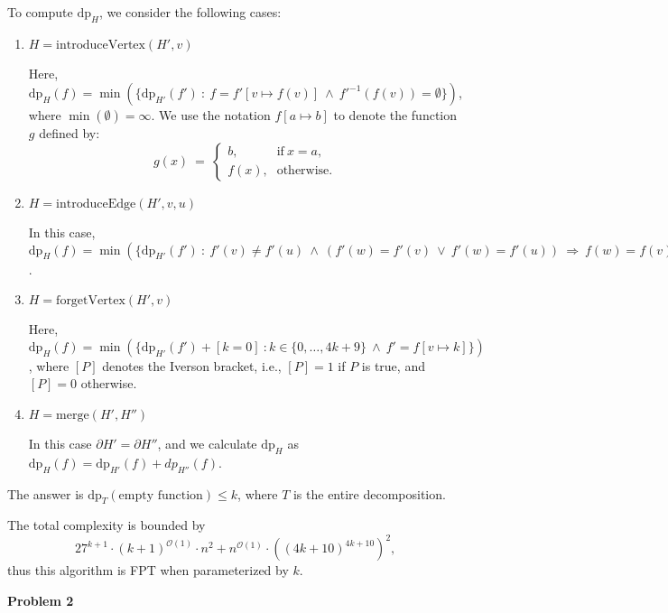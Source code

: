 \documentclass[12pt]{article}
\begin{document}
	\medskip
	
	To compute \(\text{dp}_{H}\), we consider the following cases:
	\begin{enumerate}
		\item \(H = \text{introduceVertex}(H', v)\)
		      
		      Here, \(\text{dp}_{H}(f) = \min(\{\text{dp}_{H'}(f') \ : \ f =
		      f'[v \mapsto f(v)] \ \wedge \ f'^{-1}(f(v)) = \emptyset\})\),
		      where \(\min(\emptyset) = \infty\). We use the notation
		      \(f[a \mapsto b]\) to denote the function \(g\) defined by:
		      \[ g(x) \ = \ \begin{cases} b \text{,} & \text{if} \ x = a
		      \text{,} \\ f(x) \text{,} & \text{otherwise.} \end{cases} \]
		
		\item \(H = \text{introduceEdge}(H', v, u)\)
		      
		      In this case, \(\text{dp}_{H}(f) = \min(\{\text{dp}_{H'}(f') \ : \
		      f'(v) \neq f'(u) \ \wedge \ (f'(w) = f'(v) \ \vee \ f'(w) = f'(u))
		      \ \Rightarrow \ f(w) = f(v) = f(u)\})\).
		
		\item \(H = \text{forgetVertex}(H', v)\)
		      
		      Here, \(\text{dp}_{H}(f) = \min(\{\text{dp}_{H'}(f') + [k = 0] \ :
		      k \in \{0, \ldots, 4k + 9\} \ \wedge \ f' = f[v \mapsto k]\})\),
		      where \([P]\) denotes the Iverson bracket, i.e., \([P] = 1\) if
		      \(P\) is true, and \([P] = 0\) otherwise.
		
		\item \(H = \text{merge}(H', H'')\)
		      
		      In this case \(\partial H' = \partial H''\), and we calculate
		      \(\text{dp}_{H}\) as \(\text{dp}_{H}(f) = \text{dp}_{H'}(f) +
		      dp_{H''}(f)\).
	\end{enumerate}
	The answer is \(\text{dp}_{T}(\text{empty function}) \leqslant k\), where
	\(T\) is the entire decomposition.
	
	\medskip
	
	The total complexity is bounded by
	\[ 27^{k + 1} \cdot (k + 1)^{\mathcal{O}(1)} \cdot n^{2} +
	n^{\mathcal{O}(1)} \cdot \left( (4k + 10)^{4k + 10} \right)^{2} \text{,} \]
	thus this algorithm is FPT when parameterized by \(k\).
	
	\bigskip
	
	\textbf{Problem 2}
	
\end{document}

